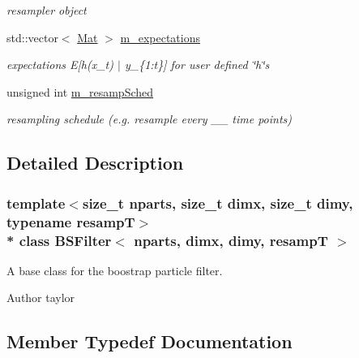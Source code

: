 \begin{DoxyCompactItemize}
\begin{DoxyCompactList}\small\item\em resampler object \end{DoxyCompactList}\item 
std\+::vector$<$ \hyperlink{classBSFilter_afdce3784f96aac7305cdeeabaacdf521}{Mat} $>$ \hyperlink{classBSFilter_a2202df613fc7686daa58d347a3d434ee}{m\+\_\+expectations}\hypertarget{classBSFilter_a2202df613fc7686daa58d347a3d434ee}{}\label{classBSFilter_a2202df613fc7686daa58d347a3d434ee}

\begin{DoxyCompactList}\small\item\em expectations E\mbox{[}h(x\+\_\+t) $\vert$ y\+\_\+\{1\+:t\}\mbox{]} for user defined \char`\"{}h\char`\"{}s \end{DoxyCompactList}\item 
unsigned int \hyperlink{classBSFilter_a2cbe1f55460723478007b2bf01acf4ce}{m\+\_\+resamp\+Sched}\hypertarget{classBSFilter_a2cbe1f55460723478007b2bf01acf4ce}{}\label{classBSFilter_a2cbe1f55460723478007b2bf01acf4ce}

\begin{DoxyCompactList}\small\item\em resampling schedule (e.\+g. resample every \+\_\+\+\_\+ time points) \end{DoxyCompactList}\end{DoxyCompactItemize}


\subsection{Detailed Description}
\subsubsection*{template$<$size\+\_\+t nparts, size\+\_\+t dimx, size\+\_\+t dimy, typename resampT$>$\\*
class B\+S\+Filter$<$ nparts, dimx, dimy, resamp\+T $>$}

A base class for the boostrap particle filter. 

\begin{DoxyAuthor}{Author}
taylor 
\end{DoxyAuthor}


\subsection{Member Typedef Documentation}

